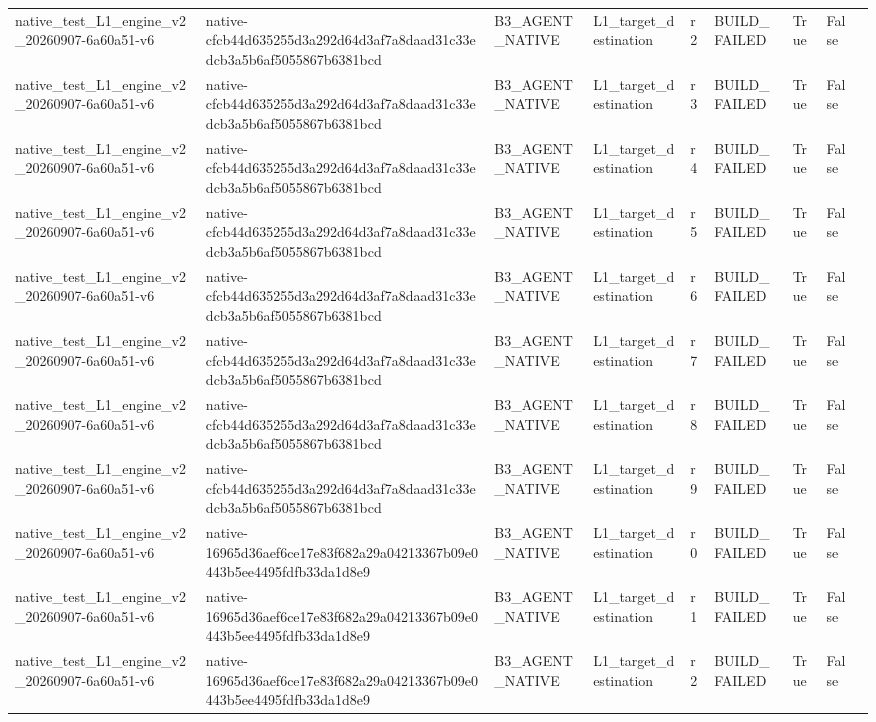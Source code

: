 \begin{tabular}{lllllllll}
native\_test\_L1\_engine\_v2\_20260907-6a60a51-v6 & native-cfcb44d635255d3a292d64d3af7a8daad31c33edcb3a5b6af5055867b6381bcd & B3\_AGENT\_NATIVE & L1\_target\_destination & r2 & BUILD\_FAILED & True & False &  \\
native\_test\_L1\_engine\_v2\_20260907-6a60a51-v6 & native-cfcb44d635255d3a292d64d3af7a8daad31c33edcb3a5b6af5055867b6381bcd & B3\_AGENT\_NATIVE & L1\_target\_destination & r3 & BUILD\_FAILED & True & False &  \\
native\_test\_L1\_engine\_v2\_20260907-6a60a51-v6 & native-cfcb44d635255d3a292d64d3af7a8daad31c33edcb3a5b6af5055867b6381bcd & B3\_AGENT\_NATIVE & L1\_target\_destination & r4 & BUILD\_FAILED & True & False &  \\
native\_test\_L1\_engine\_v2\_20260907-6a60a51-v6 & native-cfcb44d635255d3a292d64d3af7a8daad31c33edcb3a5b6af5055867b6381bcd & B3\_AGENT\_NATIVE & L1\_target\_destination & r5 & BUILD\_FAILED & True & False &  \\
native\_test\_L1\_engine\_v2\_20260907-6a60a51-v6 & native-cfcb44d635255d3a292d64d3af7a8daad31c33edcb3a5b6af5055867b6381bcd & B3\_AGENT\_NATIVE & L1\_target\_destination & r6 & BUILD\_FAILED & True & False &  \\
native\_test\_L1\_engine\_v2\_20260907-6a60a51-v6 & native-cfcb44d635255d3a292d64d3af7a8daad31c33edcb3a5b6af5055867b6381bcd & B3\_AGENT\_NATIVE & L1\_target\_destination & r7 & BUILD\_FAILED & True & False &  \\
native\_test\_L1\_engine\_v2\_20260907-6a60a51-v6 & native-cfcb44d635255d3a292d64d3af7a8daad31c33edcb3a5b6af5055867b6381bcd & B3\_AGENT\_NATIVE & L1\_target\_destination & r8 & BUILD\_FAILED & True & False &  \\
native\_test\_L1\_engine\_v2\_20260907-6a60a51-v6 & native-cfcb44d635255d3a292d64d3af7a8daad31c33edcb3a5b6af5055867b6381bcd & B3\_AGENT\_NATIVE & L1\_target\_destination & r9 & BUILD\_FAILED & True & False &  \\
native\_test\_L1\_engine\_v2\_20260907-6a60a51-v6 & native-16965d36aef6ce17e83f682a29a04213367b09e0443b5ee4495fdfb33da1d8e9 & B3\_AGENT\_NATIVE & L1\_target\_destination & r0 & BUILD\_FAILED & True & False &  \\
native\_test\_L1\_engine\_v2\_20260907-6a60a51-v6 & native-16965d36aef6ce17e83f682a29a04213367b09e0443b5ee4495fdfb33da1d8e9 & B3\_AGENT\_NATIVE & L1\_target\_destination & r1 & BUILD\_FAILED & True & False &  \\
native\_test\_L1\_engine\_v2\_20260907-6a60a51-v6 & native-16965d36aef6ce17e83f682a29a04213367b09e0443b5ee4495fdfb33da1d8e9 & B3\_AGENT\_NATIVE & L1\_target\_destination & r2 & BUILD\_FAILED & True & False &  \\

\end{tabular}
